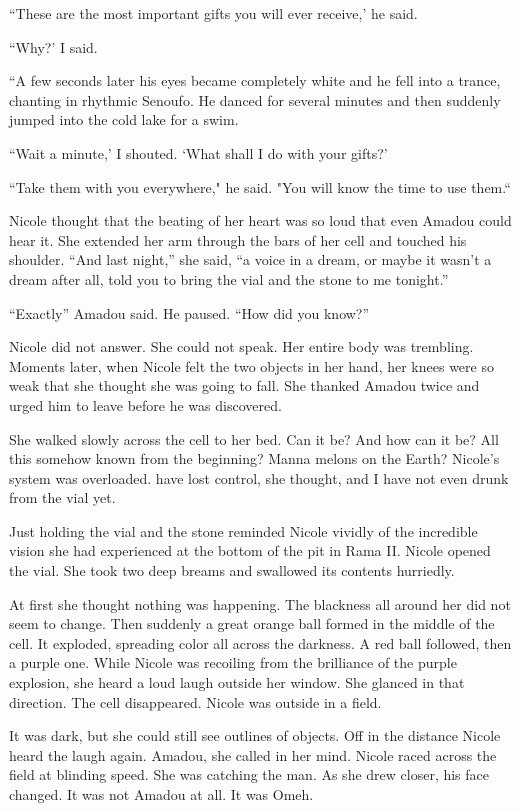 \documentclass[]{article}
\begin{document}
{{“These are the most important gifts you will ever receive,’ he said.

“Why?’ I said.

“A few seconds later his eyes became completely white and he fell into a trance, chanting in rhythmic Senoufo.  He danced for several minutes and then suddenly jumped into the cold lake for a swim.

“Wait a minute,’ I shouted.  ‘What shall I do with your gifts?’

“Take them with you everywhere," he said.  "You will know the time to use them.“

Nicole thought that the beating of her heart was so loud that even Amadou could hear it.  She extended her arm through the bars of her cell and touched his shoulder.  “And last night,” she said, “a voice in a dream, or maybe it wasn’t a dream after all, told you to bring the vial and the stone to me tonight.”

“Exactly” Amadou said.  He paused.  “How did you know?”

Nicole did not answer.  She could not speak.  Her entire body was trembling.  Moments later, when Nicole felt the two objects in her hand, her knees were so weak that she thought she was going to fall.  She thanked Amadou twice and urged him to leave before he was discovered.

She walked slowly across the cell to her bed.  Can it be?  And how can it be?  All this somehow known from the beginning?  Manna melons on the Earth?  Nicole’s system was overloaded.  have lost control, she thought, and I have not even drunk from the vial yet.

Just holding the vial and the stone reminded Nicole vividly of the incredible vision she had experienced at the bottom of the pit in Rama II.  Nicole opened the vial.  She took two deep breams and swallowed its contents hurriedly.

At first she thought nothing was happening.  The blackness all around her did not seem to change.  Then suddenly a great orange ball formed in the middle of the cell.  It exploded, spreading color all across the darkness.  A red ball followed, then a purple one.  While Nicole was recoiling from the brilliance of the purple explosion, she heard a loud laugh outside her window.  She glanced in that direction.  The cell disappeared.  Nicole was outside in a field.

It was dark, but she could still see outlines of objects.  Off in the distance Nicole heard the laugh again.  Amadou, she called in her mind.  Nicole raced across the field at blinding speed.  She was catching the man.  As she drew closer, his face changed.  It was not Amadou at all.  It was Omeh.

}}
\end{document}
